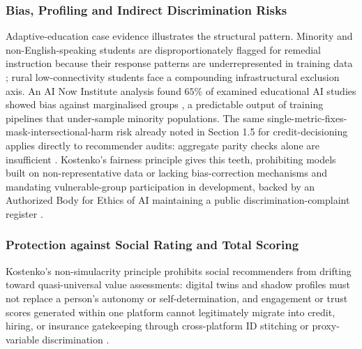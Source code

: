 \documentclass[11pt]{article}
\begin{document}
\subsubsection{Bias, Profiling and Indirect Discrimination Risks}
\label{sec:bias_profiling_indirect_discrimination} Adaptive-education case evidence illustrates the structural pattern. Minority and non-English-speaking students are disproportionately flagged for remedial instruction because their response patterns are underrepresented in training data \parencites[5]{1308731}; rural low-connectivity students face a compounding infrastructural exclusion axis. An AI Now Institute analysis found $65\%$ of examined educational AI studies showed bias against marginalised groups \parencites[7]{1308731}, a predictable output of training pipelines that under-sample minority populations. The same single-metric-fixes-mask-intersectional-harm risk already noted in Section 1.5 for credit-decisioning applies directly to recommender audits: aggregate parity checks alone are insufficient \parencites[14]{5442231}[7]{1308731}. Kostenko's fairness principle gives this teeth, prohibiting models built on non-representative data or lacking bias-correction mechanisms and mandating vulnerable-group participation in development, backed by an Authorized Body for Ethics of AI maintaining a public discrimination-complaint register \parencites[73]{2977039}[41]{2977039}[42]{2977039}.

\subsubsection{Protection against Social Rating and Total Scoring}
\label{sec:protection_social_rating_total_scoring} Kostenko's non-simulacrity principle prohibits social recommenders from drifting toward quasi-universal value assessments: digital twins and shadow profiles must not replace a person's autonomy or self-determination, and engagement or trust scores generated within one platform cannot legitimately migrate into credit, hiring, or insurance gatekeeping through cross-platform ID stitching or proxy-variable discrimination \parencites[128]{2977039}[3]{5442231}.
\end{document}
